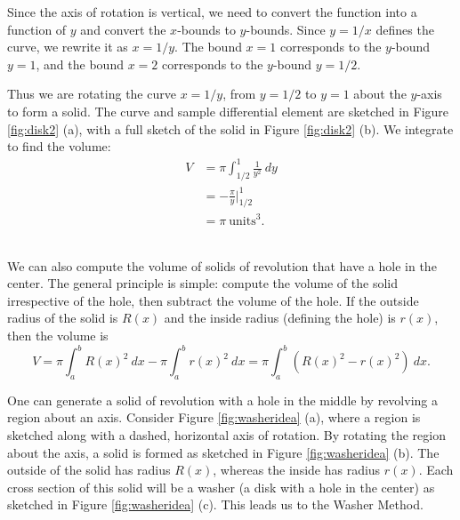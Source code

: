 {Since the axis of rotation is vertical, we need to convert the function into a function of $y$ and convert the $x$-bounds to $y$-bounds. Since $y=1/x$ defines the curve, we rewrite it as $x=1/y$. The bound $x=1$ corresponds to the $y$-bound $y=1$, and the bound $x=2$ corresponds to the $y$-bound $y=1/2$. 

Thus we are rotating the curve $x=1/y$, from $y=1/2$ to $y=1$ about the $y$-axis to form a solid. The curve and sample differential element are sketched in Figure \ref{fig:disk2} (a), with a full sketch of the solid in Figure \ref{fig:disk2} (b).
We integrate to find the volume:
\begin{align*}
V &= \pi\int_{1/2}^1 \frac{1}{y^2}\ dy \\
	&= -\frac{\pi}y\Big|_{1/2}^1 \\
	&= \pi\ \text{units}^3.
\end{align*}		
}\\

We can also compute the volume of solids of revolution that have a hole in the center. The general principle is simple: compute the volume of the solid irrespective of the hole, then subtract the volume of the hole. If the outside radius of the solid is $R(x)$ and the inside radius (defining the hole) is $r(x)$, then the volume is 
$$V = \pi\int_a^b R(x)^2 \ dx - \pi\int_a^b r(x)^2\ dx = \pi\int_a^b \left(R(x)^2-r(x)^2\right)\ dx.$$

One can generate a solid of revolution with a hole in the middle by revolving a region about an axis. Consider Figure \ref{fig:washeridea} (a), where a region is sketched along with a dashed, horizontal axis of rotation. By rotating the region about the axis, a solid is formed as sketched in Figure \ref{fig:washeridea} (b). The outside of the solid has radius $R(x)$, whereas the inside has radius $r(x)$. Each cross section of this solid will be a washer (a disk with a hole in the center) as sketched in Figure \ref{fig:washeridea} (c).	This leads us to the Washer Method.

